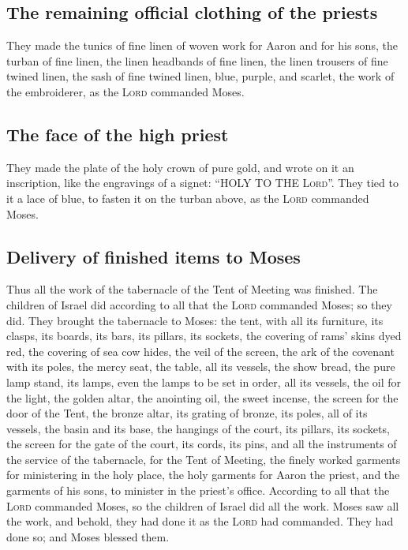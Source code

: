 \hypertarget{the-remaining-official-clothing-of-the-priests}{%
\subsection{The remaining official clothing of the
priests}\label{the-remaining-official-clothing-of-the-priests}}

 They made the tunics of fine linen of woven work for
Aaron and for his sons,  the turban of fine linen, the
linen headbands of fine linen, the linen trousers of fine twined linen,
 the sash of fine twined linen, blue, purple, and
scarlet, the work of the embroiderer, as the \textsc{Lord} commanded
Moses.

\hypertarget{the-face-of-the-high-priest}{%
\subsection{The face of the high
priest}\label{the-face-of-the-high-priest}}

 They made the plate of the holy crown of pure gold, and
wrote on it an inscription, like the engravings of a signet: ``HOLY TO
THE \textsc{Lord}''.  They tied to it a lace of blue, to
fasten it on the turban above, as the \textsc{Lord} commanded Moses.

\hypertarget{delivery-of-finished-items-to-moses}{%
\subsection{Delivery of finished items to
Moses}\label{delivery-of-finished-items-to-moses}}

 Thus all the work of the tabernacle of the Tent of
Meeting was finished. The children of Israel did according to all that
the \textsc{Lord} commanded Moses; so they did.  They
brought the tabernacle to Moses: the tent, with all its furniture, its
clasps, its boards, its bars, its pillars, its sockets, 
the covering of rams' skins dyed red, the covering of sea cow hides, the
veil of the screen,  the ark of the covenant with its
poles, the mercy seat,  the table, all its vessels, the
show bread,  the pure lamp stand, its lamps, even the
lamps to be set in order, all its vessels, the oil for the light,
 the golden altar, the anointing oil, the sweet incense,
the screen for the door of the Tent,  the bronze altar,
its grating of bronze, its poles, all of its vessels, the basin and its
base,  the hangings of the court, its pillars, its
sockets, the screen for the gate of the court, its cords, its pins, and
all the instruments of the service of the tabernacle, for the Tent of
Meeting,  the finely worked garments for ministering in
the holy place, the holy garments for Aaron the priest, and the garments
of his sons, to minister in the priest's office. 
According to all that the \textsc{Lord} commanded Moses, so the children
of Israel did all the work.  Moses saw all the work, and
behold, they had done it as the \textsc{Lord} had commanded. They had
done so; and Moses blessed them.

